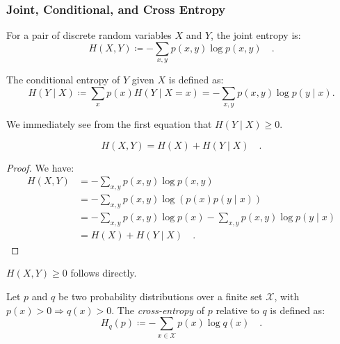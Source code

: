 \documentclass[../../main.tex]{subfiles}
\begin{document}
\subsubsection{Joint, Conditional, and Cross Entropy}

\begin{definition}
    For a pair of discrete random variables \( X \) and \( Y \), the joint entropy is:
    \[
        H(X, Y) \coloneqq -\sum_{x,y} p(x, y) \log p(x, y) \quad .
    \]
\end{definition}

\begin{definition}
    The conditional entropy of \( Y \) given \( X \) is defined as:
    \[
        H(Y \mid X) \coloneqq \sum_{x} p(x) H(Y \mid X = x) = -\sum_{x, y} p(x, y) \log p(y \mid x).
    \]
\end{definition}

\begin{corollary}
    We immediately see from the first equation that $H(Y \mid X) \geq 0$.
\end{corollary}

\begin{theorem}
    \[
        H(X, Y) = H(X) + H(Y \mid X) \quad .
    \]
\end{theorem}
\vspace{-2.5em}
\begin{proof}
    We have:
    \begin{align*}
        H(X, Y) &= - \sum_{x,y} p(x, y) \log p(x, y) \\
        &= - \sum_{x,y} p(x, y) \log \left(p(x) p(y \mid x) \right) \\
        &= - \sum_{x,y} p(x, y) \log p(x) - \sum_{x,y} p(x, y) \log p(y \mid x) \\
        &= H(X) + H(Y \mid X) \quad .
    \end{align*}
\end{proof}

\begin{corollary}
    $H(X, Y) \geq 0$ follows directly.
\end{corollary}

\begin{definition}
    Let \( p \) and \( q \) be two probability distributions over a finite set \( \mathcal{X} \), with \( p(x) > 0 \Rightarrow q(x) > 0 \). The \emph{cross-entropy} of \( p \) relative to \( q \) is defined as:
    \[
        H_q(p) \coloneqq -\sum_{x \in \mathcal{X}} p(x) \log q(x) \quad .
    \]
\end{definition}
\end{document}
